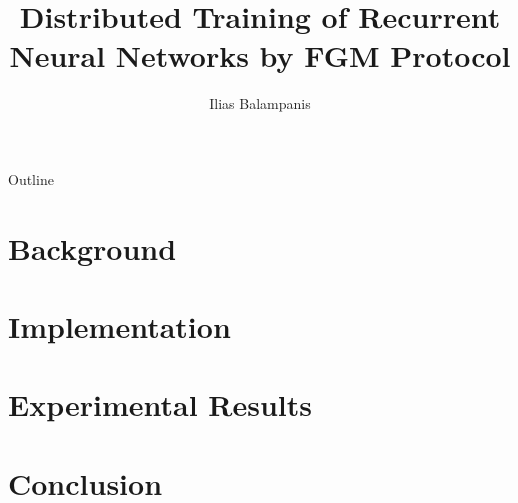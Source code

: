 \documentclass{beamer}
\title[Diploma Thesis Presentation]{Distributed Training of Recurrent Neural Networks by FGM Protocol}
\author{Ilias Balampanis}
\institute[TUC]{ %
School of Electrical and Computer Engineering \\
Technical University of Crete}
\begin{document}
    \begin{frame}
        \titlepage
    \end{frame}

    \begin{frame}{Outline}
        \tableofcontents
    \end{frame}

    \section{Background}\label{sec:background}
    

    \section{Implementation}\label{sec:implementation}
    

    \section{Experimental Results}\label{sec:experimental-results}
    

    \section{Conclusion}\label{sec:conclusion}
    
\end{document}
